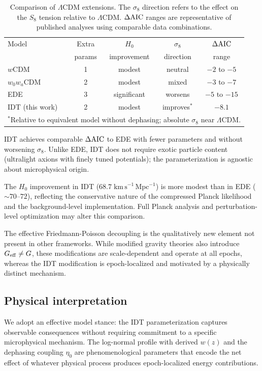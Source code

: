 \documentclass[aps,prd,twocolumn,superscriptaddress,nofootinbib]{revtex4-2}
\newcommand{\Geff}{G_{\rm eff}}
\newcommand{\dAIC}{\Delta{\rm AIC}}
\begin{document}
\begin{table}[h]
\centering
\caption{Comparison of $\Lambda$CDM extensions. The $\sigma_8$
direction refers to the effect on the $S_8$ tension relative to
$\Lambda$CDM. $\dAIC$ ranges are representative of published
analyses using comparable data combinations.}
\label{tab:comparison}
\begin{tabular}{lcccc}
\hline\hline
Model & Extra & $H_0$ & $\sigma_8$ & $\dAIC$ \\
      & params & improvement & direction & range \\
\hline
$w$CDM & 1 & modest & neutral & $-2$ to $-5$ \\
$w_0 w_a$CDM & 2 & modest & mixed & $-3$ to $-7$ \\
EDE & 3 & significant & worsens & $-5$ to $-15$ \\
IDT (this work) & 2 & modest & improves$^*$ & $-8.1$ \\
\hline\hline
\multicolumn{5}{l}{\footnotesize $^*$Relative to equivalent model
without dephasing; absolute $\sigma_8$ near $\Lambda$CDM.}
\end{tabular}
\end{table}

IDT achieves comparable $\dAIC$ to EDE with fewer parameters and
without worsening $\sigma_8$. Unlike EDE, IDT does not require
exotic particle content (ultralight axions with finely tuned
potentials); the parameterization is agnostic about microphysical
origin.

The $H_0$ improvement in IDT ($68.7\;\mathrm{km\,s^{-1}\,Mpc^{-1}}$)
is more modest than in EDE ($\sim 70$--$72$), reflecting the
conservative nature of the compressed Planck likelihood and the
background-level implementation. Full Planck analysis and
perturbation-level optimization may alter this comparison.

The effective Friedmann-Poisson decoupling is the qualitatively
new element not present in other frameworks. While modified gravity
theories also introduce $\Geff \neq G$, these modifications are
scale-dependent and operate at all epochs, whereas the IDT
modification is epoch-localized and motivated by a physically
distinct mechanism.

\subsection{Physical interpretation}

We adopt an effective model stance: the IDT parameterization
captures observable consequences without requiring commitment to
a specific microphysical mechanism. The log-normal profile with
derived $w(z)$ and the dephasing coupling $\eta_0$ are
phenomenological parameters that encode the net effect of whatever
physical process produces epoch-localized energy contributions.
\end{document}
